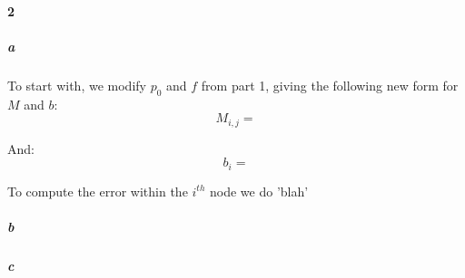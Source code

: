 \documentclass{article}
\begin{document}
\paragraph{2}

\subparagraph{a}

To start with, we modify $p_0$ and $f$ from part 1, giving the following new form for $M$ and $b$:
\[ M_{i,j} = \]

And:
\[ b_i = \]

To compute the error within the $i^{th}$ node we do 'blah'

\subparagraph{b}

\subparagraph{c}
\end{document}
